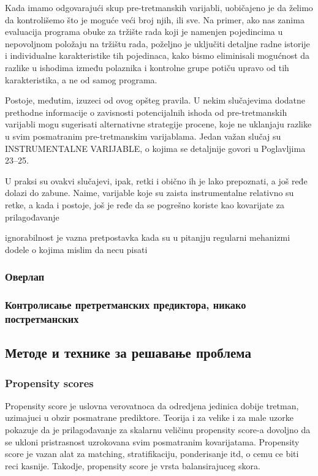 \documentclass[12pt, a4paper]{article}
\begin{document}
Kada imamo odgovarajući skup pre-tretmanskih varijabli, uobičajeno je da želimo da kontrolišemo što je moguće veći broj njih, ili sve. Na primer, ako nas zanima evaluacija programa obuke za tržište rada koji je namenjen pojedincima u nepovoljnom položaju na tržištu rada, poželjno je uključiti detaljne radne istorije i individualne karakteristike tih pojedinaca, kako bismo eliminisali mogućnost da razlike u ishodima između polaznika i kontrolne grupe potiču upravo od tih karakteristika, a ne od samog programa.

Postoje, međutim, izuzeci od ovog opšteg pravila. U nekim slučajevima dodatne prethodne informacije o zavisnosti potencijalnih ishoda od pre-tretmanskih varijabli mogu sugerisati alternativne strategije procene, koje ne uklanjaju razlike u svim posmatranim pre-tretmanskim varijablama. Jedan važan slučaj su INSTRUMENTALNE VARIJABLE, o kojima se detaljnije govori u Poglavljima 23–25.

U praksi su ovakvi slučajevi, ipak, retki i obično ih je lako prepoznati, a još ređe dolazi do zabune. Naime, varijable koje su zaista instrumentalne relativno su retke, a kada i postoje, još je ređe da se pogrešno koriste kao kovarijate za prilagođavanje


ignorabilnost je vazna pretpostavka kada su u pitanjju regularni mehanizmi dodele o kojima mislim da necu pisati

\subsubsection{Оверлап}


\subsubsection{Контролисање претретманских предиктора, никако постретманских}

\subsection{Методе и технике за решавање проблема}

\subsubsection{Propensity scores}

Propensity score je uslovna  verovatnoca da odredjena jedinica dobije tretman, uzimajuci u obzir posmatrane prediktore. Teorija i za velike i za male uzorke pokazuje da je prilagođavanje za skalarnu veličinu propensity score-a dovoljno da se ukloni pristrasnost uzrokovana svim posmatranim kovarijatama. Propensity score je vazan alat za matching, stratifikaciju, ponderisanje itd, o cemu ce biti reci kasnije. Takodje, propensity score je vrsta balansirajuceg skora.
\end{document}
